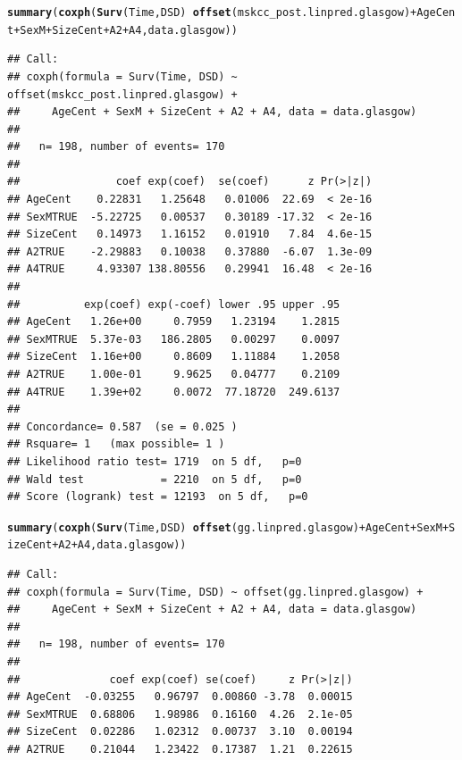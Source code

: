 \documentclass{article}\usepackage[]{graphicx}\usepackage[]{color}
\makeatletter
\newcommand{\hlopt}[1]{\textcolor[rgb]{0,0,0}{#1}}%
\newcommand{\hlstd}[1]{\textcolor[rgb]{0.345,0.345,0.345}{#1}}%
\newcommand{\hlkwd}[1]{\textcolor[rgb]{0.737,0.353,0.396}{\textbf{#1}}}%
\newenvironment{kframe}{%
 \def\at@end@of@kframe{}%
 \ifinner\ifhmode%
  \def\at@end@of@kframe{\end{minipage}}%
  \begin{minipage}{\columnwidth}%
 \fi\fi%
 \def\FrameCommand##1{\hskip\@totalleftmargin \hskip-\fboxsep
 \colorbox{shadecolor}{##1}\hskip-\fboxsep
     \hskip-\linewidth \hskip-\@totalleftmargin \hskip\columnwidth}%
 \MakeFramed {\advance\hsize-\width
   \@totalleftmargin\z@ \linewidth\hsize
   \@setminipage}}%
 {\par\unskip\endMakeFramed%
 \at@end@of@kframe}
\newenvironment{knitrout}{}{} %
\makeatother
\begin{document}
\begin{knitrout}
\begin{kframe}
{\ttfamily\noindent\bfseries\color{errorcolor}{\#\# Error in fitter(X, Y, strats, offset, init, control, weights = weights, : NA/NaN/Inf in foreign function call (arg 6)}}\begin{alltt}
\hlkwd{summary}\hlstd{(}\hlkwd{coxph}\hlstd{(}\hlkwd{Surv}\hlstd{(Time, DSD)} \hlopt{~} \hlkwd{offset}\hlstd{(mskcc_post.linpred.glasgow)} \hlopt{+} \hlstd{AgeCent} \hlopt{+} \hlstd{SexM} \hlopt{+} \hlstd{SizeCent} \hlopt{+} \hlstd{A2} \hlopt{+} \hlstd{A4, data.glasgow))}
\end{alltt}
\begin{verbatim}
## Call:
## coxph(formula = Surv(Time, DSD) ~ offset(mskcc_post.linpred.glasgow) + 
##     AgeCent + SexM + SizeCent + A2 + A4, data = data.glasgow)
## 
##   n= 198, number of events= 170 
## 
##               coef exp(coef)  se(coef)      z Pr(>|z|)
## AgeCent    0.22831   1.25648   0.01006  22.69  < 2e-16
## SexMTRUE  -5.22725   0.00537   0.30189 -17.32  < 2e-16
## SizeCent   0.14973   1.16152   0.01910   7.84  4.6e-15
## A2TRUE    -2.29883   0.10038   0.37880  -6.07  1.3e-09
## A4TRUE     4.93307 138.80556   0.29941  16.48  < 2e-16
## 
##          exp(coef) exp(-coef) lower .95 upper .95
## AgeCent   1.26e+00     0.7959   1.23194    1.2815
## SexMTRUE  5.37e-03   186.2805   0.00297    0.0097
## SizeCent  1.16e+00     0.8609   1.11884    1.2058
## A2TRUE    1.00e-01     9.9625   0.04777    0.2109
## A4TRUE    1.39e+02     0.0072  77.18720  249.6137
## 
## Concordance= 0.587  (se = 0.025 )
## Rsquare= 1   (max possible= 1 )
## Likelihood ratio test= 1719  on 5 df,   p=0
## Wald test            = 2210  on 5 df,   p=0
## Score (logrank) test = 12193  on 5 df,   p=0
\end{verbatim}
\begin{alltt}
\hlkwd{summary}\hlstd{(}\hlkwd{coxph}\hlstd{(}\hlkwd{Surv}\hlstd{(Time, DSD)} \hlopt{~} \hlkwd{offset}\hlstd{(gg.linpred.glasgow)} \hlopt{+} \hlstd{AgeCent} \hlopt{+} \hlstd{SexM} \hlopt{+} \hlstd{SizeCent} \hlopt{+} \hlstd{A2} \hlopt{+} \hlstd{A4, data.glasgow))}
\end{alltt}
\begin{verbatim}
## Call:
## coxph(formula = Surv(Time, DSD) ~ offset(gg.linpred.glasgow) + 
##     AgeCent + SexM + SizeCent + A2 + A4, data = data.glasgow)
## 
##   n= 198, number of events= 170 
## 
##              coef exp(coef) se(coef)     z Pr(>|z|)
## AgeCent  -0.03255   0.96797  0.00860 -3.78  0.00015
## SexMTRUE  0.68806   1.98986  0.16160  4.26  2.1e-05
## SizeCent  0.02286   1.02312  0.00737  3.10  0.00194
## A2TRUE    0.21044   1.23422  0.17387  1.21  0.22615

\end{verbatim}
\end{kframe}
\end{knitrout}
\end{document}
